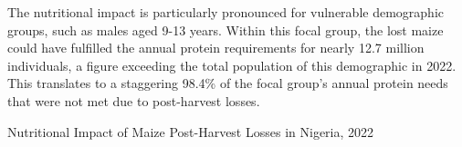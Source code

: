 {The nutritional impact is particularly pronounced for vulnerable demographic groups, such as males aged 9-13 years. Within this focal group, the lost maize could have fulfilled the annual protein requirements for nearly 12.7 million individuals, a figure exceeding the total population of this demographic in 2022. This translates to a staggering 98.4\% of the focal group's annual protein needs that were not met due to post-harvest losses. 
\begin{table}[h!]
    \centering
    \caption{Nutritional Impact of Maize Post-Harvest Losses in Nigeria, 2022}
    \label{tab:table-01}
    

\end{table}}
